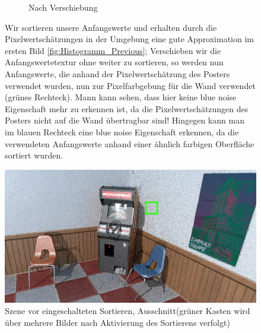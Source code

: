 \begin{figure}[H]
\begin{subfigure}{0.4\textwidth}
        \caption{Nach Verschiebung}
        \label{fig:Histogram_Post}
    \end{subfigure}
    \caption{Wir sortieren unsere Anfangswerte und erhalten durch die Pixelwertschätzungen in der Umgebung eine gute Approximation im ersten Bild
    \ref{fig:Histogramm_Previous}; Verschieben wir die Anfangswertetextur ohne weiter zu sortieren, so werden nun Anfangswerte, die anhand der Pixelwertschätzung des
    Posters verwendet wurden, nun zur Pixelfarbgebung für die Wand verwendet (grünes Rechteck). Mann kann sehen, dass hier keine blue noise Eigenschaft mehr zu erkennen
    ist, da die Pixelwertschätzungen des Posters nicht auf die Wand übertragbar sind! Hingegen kann man im blauen Rechteck eine blue noise Eigenschaft erkennen, da 
    die verwendeten Anfangswerte anhand einer ähnlich farbigen Oberfläche sortiert wurden.} 
    \label{fig:Vergleich der Histogramme}
\end{figure}


\newpage

\begin{figure}[H]
        \centering \includegraphics[scale=.25]{content/TemporalerAlg/Bilder/Sorting/Szene/Szene1.png}
        \caption{Szene vor eingeschalteten Sortieren, Ausschnitt(grüner Kasten wird über mehrere 
        Bilder nach Aktivierung des Sortierens verfolgt)}
        \label{fig:Nur_Sorting_Szene_t1}
\end{figure}

